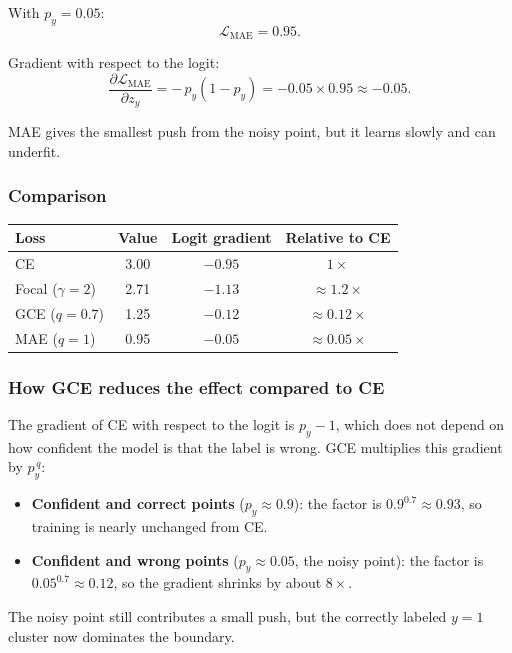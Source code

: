 \documentclass[11pt]{article}
\begin{document}
With $p_y = 0.05$:
\[
\mathcal{L}_{\mathrm{MAE}} = 0.95.
\]

Gradient with respect to the logit:
\[
\frac{\partial \mathcal{L}_{\mathrm{MAE}}}{\partial z_y} = -\,p_y(1 - p_y) = -0.05 \times 0.95 \approx -0.05.
\]

MAE gives the smallest push from the noisy point, but it learns slowly and can underfit.

\subsubsection*{Comparison}

\begin{center}
\begin{tabular}{lccc}
\toprule
Loss & Value & Logit gradient & Relative to CE \\
\midrule
CE                    & 3.00 & $-0.95$ & $1\times$ \\
Focal ($\gamma = 2$)  & 2.71 & $-1.13$ & $\approx 1.2\times$ \\
GCE ($q = 0.7$)       & 1.25 & $-0.12$ & $\approx 0.12\times$ \\
MAE ($q = 1$)         & 0.95 & $-0.05$ & $\approx 0.05\times$ \\
\bottomrule
\end{tabular}
\end{center}

\subsubsection*{How GCE reduces the effect compared to CE}

The gradient of CE with respect to the logit is $p_y - 1$, which does not depend on how confident the model is that the label is wrong. GCE multiplies this gradient by $p_y^{\,q}$:
\begin{itemize}[leftmargin=*]
  \item \textbf{Confident and correct points} ($p_y \approx 0.9$): the factor is $0.9^{0.7} \approx 0.93$, so training is nearly unchanged from CE.
  \item \textbf{Confident and wrong points} ($p_y \approx 0.05$, the noisy point): the factor is $0.05^{0.7} \approx 0.12$, so the gradient shrinks by about $8\times$.
\end{itemize}

The noisy point still contributes a small push, but the correctly labeled $y=1$ cluster now dominates the boundary.
\end{document}
